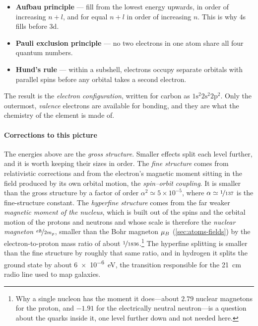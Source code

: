         \begin{itemize}
            \item \textbf{Aufbau principle} --- fill from the lowest energy upwards, in order of increasing $n+l$, and for equal $n+l$ in order of increasing $n$. This is why $4$s fills before $3$d.
            \item \textbf{Pauli exclusion principle} --- no two electrons in one atom share all four quantum numbers.
            \item \textbf{Hund's rule} --- within a subshell, electrons occupy separate orbitals with parallel spins before any orbital takes a second electron.
        \end{itemize}

        The result is the \emph{electron configuration}, written for carbon as $1\text{s}^{2}2\text{s}^{2}2\text{p}^{2}$. Only the outermost, \emph{valence} electrons are available for bonding, and they are what the chemistry of the element is made of.

        \paragraph{Corrections to this picture}

            The energies above are the \emph{gross structure}. Smaller effects split each level further, and it is worth keeping their sizes in order. The \emph{fine structure} comes from relativistic corrections and from the electron's magnetic moment sitting in the field produced by its own orbital motion, the \emph{spin--orbit coupling}. It is smaller than the gross structure by a factor of order $\alpha^{2}\simeq5\times10^{-5}$, where $\alpha \simeq \nicefrac{1}{137}$ is the fine-structure constant. The \emph{hyperfine structure} comes from the far weaker \emph{magnetic moment of the nucleus}, which is built out of the spins and the orbital motion of the protons and neutrons and whose scale is therefore the \emph{nuclear magneton} $\nicefrac{e\hbar}{2m_{p}}$, smaller than the Bohr magneton $\mu_{B}$ (\cref{sec:atoms-fields}) by the electron-to-proton mass ratio of about $\nicefrac{1}{1836}$.\footnote{Why a single nucleon has the moment it does---about $2.79$ nuclear magnetons for the proton, and $-1.91$ for the electrically neutral neutron---is a question about the quarks inside it, one level further down and not needed here.} The hyperfine splitting is smaller than the fine structure by roughly that same ratio, and in hydrogen it splits the ground state by about \qty{6e-6}{\electronvolt}, the transition responsible for the \qty{21}{\centi\metre} radio line used to map galaxies.

